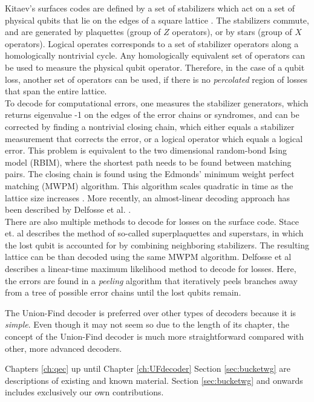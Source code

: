 Kitaev's surfaces codes are defined by a set of stabilizers which act on a set of physical qubits that lie on the edges of a square lattice \cite{dennis2002topological}. The stabilizers commute, and are generated by plaquettes (group of $Z$ operators), or by stars (group of $X$ operators). Logical operates corresponds to a set of stabilizer operators along a homologically nontrivial cycle. Any homologically equivalent set of operators can be used to measure the physical qubit operator. Therefore, in the case of a qubit loss, another set of operators can be used, if there is no \emph{percolated} region of losses that span the entire lattice. \\

To decode for computational errors, one measures the stabilizer generators, which returns eigenvalue -1 on the edges of the error chains or syndromes, and can be corrected by finding a nontrivial closing chain, which either equals a stabilizer measurement that corrects the error, or a logical operator which equals a logical error. This problem is equivalent to the two dimensional random-bond Ising model (RBIM), where the shortest path needs to be found between matching pairs. The closing chain is found using the Edmonds' minimum weight perfect matching (MWPM) algorithm. This algorithm scales quadratic in time as the lattice size increases \cite{stace2009thresholds}. More recently, an almost-linear decoding approach has been described by Delfosse et al. \cite{delfosse2017linear}. \\

There are also multiple methods to decode for losses on the surface code. Stace et. al \cite{stace2009thresholds,stace2010error} describes the method of so-called superplaquettes and superstars, in which the lost qubit is accounted for by combining neighboring stabilizers. The resulting lattice can be than decoded using the same MWPM algorithm. Delfosse et al \cite{delfosse2017linear} describes a linear-time maximum likelihood method to decode for losses. Here, the errors are found in a \emph{peeling} algorithm that iteratively peels branches away from a tree of possible error chains until the lost qubits remain.

The Union-Find decoder is preferred over other types of decoders because it is \emph{simple}. Even though it may not seem so due to the length of its chapter, the concept of the Union-Find decoder is much more straightforward compared with other, more advanced decoders. 


Chapters \ref{ch:qec} up until Chapter \ref{ch:UFdecoder} Section \ref{sec:bucketwg} are descriptions of existing and known material. Section \ref{sec:bucketwg} and onwards includes exclusively our own contributions. 